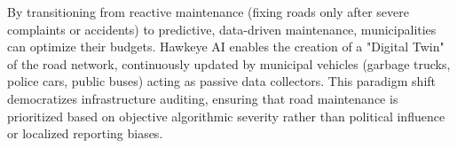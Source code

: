 By transitioning from reactive maintenance (fixing roads only after severe complaints or accidents) to predictive, data-driven maintenance, municipalities can optimize their budgets. Hawkeye AI enables the creation of a "Digital Twin" of the road network, continuously updated by municipal vehicles (garbage trucks, police cars, public buses) acting as passive data collectors. This paradigm shift democratizes infrastructure auditing, ensuring that road maintenance is prioritized based on objective algorithmic severity rather than political influence or localized reporting biases.

\lipsum[1-5] %
